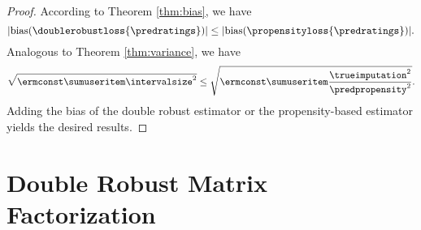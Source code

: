 \begin{proof}
According to Theorem \ref{thm:bias}, we have
\begin{equation*}
|\text{bias}(\doublerobustloss{\predratings})|
\leq
|\text{bias}(\propensityloss{\predratings})|
\text{.}
\end{equation*}
Analogous to Theorem \ref{thm:variance}, we have
\begin{equation*}
\begin{aligned}
\sqrt{
\ermconst
\sumuseritem\intervalsize^{2}
}
\leq
\sqrt{
\ermconst
\sumuseritem\frac{\trueimputation^{2}}{\predpropensity^{2}}
}
\text{.}
\end{aligned}
\end{equation*}
Adding the bias of the double robust estimator or the propensity-based estimator yields the desired results.
\end{proof}


\section{Double Robust Matrix Factorization} \label{sec:double robust matrix factorization}
